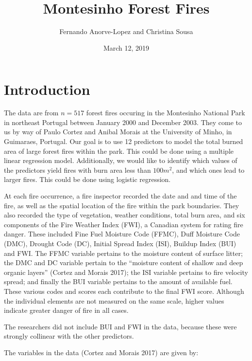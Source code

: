 \documentclass[]{article}
\title{Montesinho Forest Fires}
\author{Fernando Anorve-Lopez and Christina Sousa}
\date{March 12, 2019}
\begin{document}
\maketitle

\section{Introduction}\label{introduction}

The data are from \(n=517\) forest fires occuring in the Montesinho
National Park in northeast Portugal between January 2000 and December
2003. They come to us by way of Paulo Cortez and Anibal Morais at the
University of Minho, in Guimaraes, Portugal. Our goal is to use 12
predictors to model the total burned area of large forest fires within
the park. This could be done using a multiple linear regression model.
Additionally, we would like to identify which values of the predictors
yield fires with burn area less than \(100m^2\), and which ones lead to
larger fires. This could be done using logistic regression.

At each fire occurrence, a fire inspector recorded the date and and time
of the fire, as well as the spatial location of the fire within the park
boundaries. They also recorded the type of vegetation, weather
conditions, total burn area, and six components of the Fire Weather
Index (FWI), a Canadian system for rating fire danger. These included
Fine Fuel Moisture Code (FFMC), Duff Moisture Code (DMC), Drought Code
(DC), Initial Spread Index (ISI), Buildup Index (BUI) and FWI. The FFMC
variable pertains to the moisture content of surface litter; the DMC and
DC variable pertain to the ``moisture content of shallow and deep
organic layers'' (Cortez and Morais 2017); the ISI variable pertains to
fire velocity spread; and finally the BUI variable pertains to the
amount of available fuel. These various codes and scores each contribute
to the final FWI score. Although the individual elements are not
measured on the same scale, higher values indicate greater danger of
fire in all cases.

The researchers did not include BUI and FWI in the data, because these
were strongly collinear with the other predictors.

The variables in the data (Cortez and Morais 2017) are given by:
\end{document}
